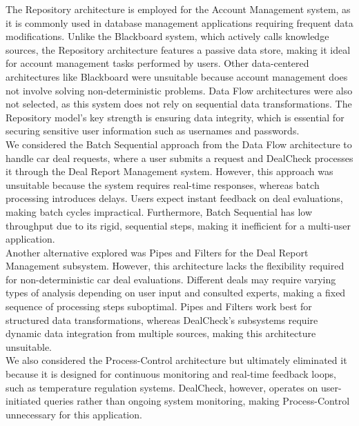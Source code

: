 \documentclass[]{article}
\begin{document}
The Repository architecture is employed for the Account Management system, as it is commonly used in database management applications requiring frequent data modifications. Unlike the Blackboard system, which actively calls knowledge sources, the Repository architecture features a passive data store, making it ideal for account management tasks performed by users. Other data-centered architectures like Blackboard were unsuitable because account management does not involve solving non-deterministic problems. Data Flow architectures were also not selected, as this system does not rely on sequential data transformations. The Repository model's key strength is ensuring data integrity, which is essential for securing sensitive user information such as usernames and passwords. \\

We considered the Batch Sequential approach from the Data Flow architecture to handle car deal requests, where a user submits a request and DealCheck processes it through the Deal Report Management system. However, this approach was unsuitable because the system requires real-time responses, whereas batch processing introduces delays. Users expect instant feedback on deal evaluations, making batch cycles impractical. Furthermore, Batch Sequential has low throughput due to its rigid, sequential steps, making it inefficient for a multi-user application. \\

Another alternative explored was Pipes and Filters for the Deal Report Management subsystem. However, this architecture lacks the flexibility required for non-deterministic car deal evaluations. Different deals may require varying types of analysis depending on user input and consulted experts, making a fixed sequence of processing steps suboptimal. Pipes and Filters work best for structured data transformations, whereas DealCheck's subsystems require dynamic data integration from multiple sources, making this architecture unsuitable. \\

We also considered the Process-Control architecture but ultimately eliminated it because it is designed for continuous monitoring and real-time feedback loops, such as temperature regulation systems. DealCheck, however, operates on user-initiated queries rather than ongoing system monitoring, making Process-Control unnecessary for this application. \\

\end{document}
